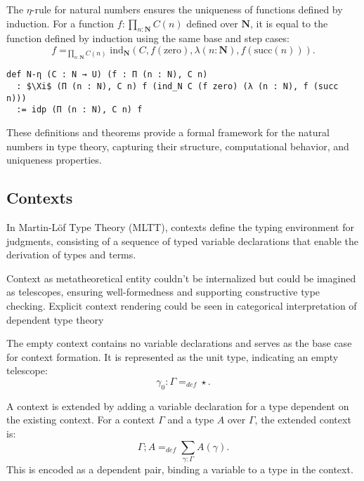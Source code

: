 \documentclass{article}
\begin{document}
\begin{theorem}
The $\eta$-rule for natural numbers ensures the uniqueness of functions defined by induction. For a function $f : \prod_{n : \mathbf{N}} C(n)$ defined over $\mathbf{N}$, it is equal to the function defined by induction using the same base and step cases:
\[
f =_{\prod_{n : \mathbf{N}} C(n)} \mathrm{ind}_\mathbf{N}(C, f(\mathrm{zero}), \lambda (n : \mathbf{N}), f(\mathrm{succ}(n))).
\]
\begin{lstlisting}[mathescape=true]
def N-η (C : N → U) (f : Π (n : N), C n)
  : $\Xi$ (Π (n : N), C n) f (ind_N C (f zero) (λ (n : N), f (succ n)))
  := idp (Π (n : N), C n) f
\end{lstlisting}
\end{theorem}

These definitions and theorems provide a formal framework for the natural numbers in type theory, capturing their structure, computational behavior, and uniqueness properties.

\subsection*{Contexts}
In Martin-Löf Type Theory (MLTT), contexts define the typing
environment for judgments, consisting of a sequence of typed
variable declarations that enable the derivation of types and
terms.

Context as metatheoretical entity couldn't be internalized but could be
imagined as telescopes, ensuring well-formedness and supporting
constructive type checking. Explicit context rendering could be
seen in categorical interpretation of dependent type theory

\begin{definition}
The empty context contains no variable declarations and serves as the base case for context formation.
It is represented as the unit type, indicating an empty telescope:
\[
\gamma_0 : \Gamma =_{def} \star.
\]
\end{definition}

\begin{definition}
A context is extended by adding a variable declaration for a
type dependent on the existing context. For a context \( \Gamma \)
and a type \( A \) over \( \Gamma \), the extended context is:
\[
\Gamma ; A =_{def} \sum_{\gamma:\Gamma}A(\gamma).
\]
This is encoded as a dependent pair,
binding a variable to a type in the context.
\end{definition}
\end{document}
